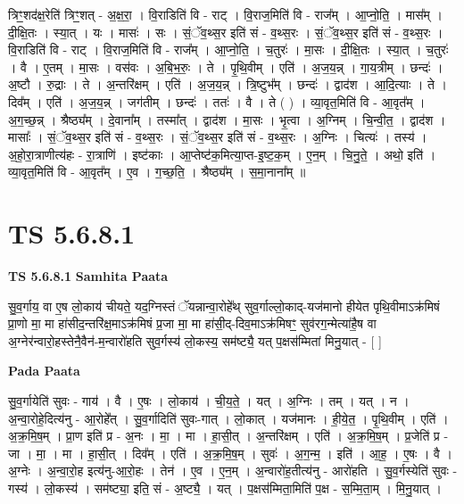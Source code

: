 \documentclass[17pt]{extarticle}
\begin{document}
त्रिꣳ॒॒शद॑क्ष॒रेति॑ त्रिꣳ॒॒शत् - अ॒क्ष॒रा॒ । वि॒राडिति॑ वि - राट् । वि॒राज॒मिति॑ वि - राज᳚म् । आ॒प्नो॒ति॒ । मास᳚म् । दी॒क्षि॒तः । स्या॒त् । यः । मासः॑ । सः । सं॒ॅव॒थ्स॒र इति॑ सं - व॒थ्स॒रः । सं॒ॅव॒थ्स॒र इति॑ सं - व॒थ्स॒रः । वि॒राडिति॑ वि - राट् । वि॒राज॒मिति॑ वि - राज᳚म् । आ॒प्नो॒ति॒ । च॒तुरः॑ । मा॒सः । दी॒क्षि॒तः । स्या॒त् । च॒तुरः॑ । वै । ए॒तम् । मा॒सः । वस॑वः । अ॒बि॒भ॒रुः॒ । ते । पृ॒थि॒वीम् । एति॑ । अ॒ज॒य॒न्न् । गा॒य॒त्रीम् । छन्दः॑ । अ॒ष्टौ । रु॒द्राः । ते । अ॒न्तरि॑क्षम् । एति॑ । अ॒ज॒य॒न्न् । त्रि॒ष्टुभ᳚म् । छन्दः॑ । द्वाद॑श । आ॒दि॒त्याः । ते । दिव᳚म् । एति॑ । अ॒ज॒य॒न्न् । जग॑तीम् । छन्दः॑ । ततः॑ । वै । ते ( ) । व्या॒वृत॒मिति॑ वि - आ॒वृत᳚म् । अ॒ग॒च्छ॒न्न् । श्रैष्ठ्य᳚म् । दे॒वाना᳚म् । तस्मा᳚त् । द्वाद॑श । मा॒सः । भृ॒त्वा । अ॒ग्निम् । चि॒न्वी॒त॒ । द्वाद॑श । मासाः᳚ । सं॒ॅव॒थ्स॒र इति॑ सं - व॒थ्स॒रः । सं॒ॅव॒थ्स॒र इति॑ सं - व॒थ्स॒रः । अ॒ग्निः । चित्यः॑ । तस्य॑ । अ॒हो॒रा॒त्राणीत्य॑हः - रा॒त्राणि॑ । इष्ट॑काः । आ॒प्तेष्ट॑क॒मित्या॒प्त-इ॒ष्ट॒क॒म् । ए॒न॒म् । चि॒नु॒ते॒ । अथो॒ इति॑ । व्या॒वृत॒मिति॑ वि - आ॒वृत᳚म् । ए॒व । ग॒च्छ॒ति॒ । श्रैष्ठ्य᳚म् । स॒मा॒नाना᳚म् ॥  \newline




\section*{ TS 5.6.8.1 }

\textbf{TS 5.6.8.1 } \newline
\textbf{Samhita Paata} \newline

सु॒व॒र्गाय॒ वा ए॒ष लो॒काय॑ चीयते॒ यद॒ग्निस्तं ॅयन्नान्वा॒रोहे᳚थ् सुव॒र्गाल्लो॒काद्-यज॑मानो हीयेत पृथि॒वीमाऽक्र॑मिषं प्रा॒णो मा॒ मा हा॑सीद॒न्तरि॑क्ष॒माऽक्र॑मिषं प्र॒जा मा॒ मा हा॑सी॒द्-दिव॒माऽक्र॑मिषꣳ॒॒ सुव॑रग॒न्मेत्या॑है॒ष वा अ॒ग्नेर॑न्वारो॒हस्तेनै॒वैन॑-म॒न्वारो॑हति सुव॒र्गस्य॑ लो॒कस्य॒ सम॑ष्ट्यै॒ यत् प॒क्षस॑म्मितां मिनु॒यात् - [  ] \newline

\textbf{Pada Paata} \newline

सु॒व॒र्गायेति॑ सुवः - गाय॑ । वै । ए॒षः । लो॒काय॑ । ची॒य॒ते॒ । यत् । अ॒ग्निः । तम् । यत् । न । अ॒न्वा॒रोहे॒दित्य॑नु - आ॒रोहे᳚त् । सु॒व॒र्गादिति॑ सुवः-गात् । लो॒कात् । यज॑मानः । ही॒ये॒त॒ । पृ॒थि॒वीम् । एति॑ । अ॒क्र॒मि॒ष॒म् । प्रा॒ण इति॑ प्र - अ॒नः । मा॒ । मा । हा॒सी॒त् । अ॒न्तरि॑क्षम् । एति॑ । अ॒क्र॒मि॒ष॒म् । प्र॒जेति॑ प्र - जा । मा॒ । मा । हा॒सी॒त् । दिव᳚म् । एति॑ । अ॒क्र॒मि॒ष॒म् । सुवः॑ । अ॒ग॒न्म॒ । इति॑ । आ॒ह॒ । ए॒षः । वै । अ॒ग्नेः । अ॒न्वा॒रो॒ह इत्य॑नु-आ॒रो॒हः । तेन॑ । ए॒व । ए॒न॒म् । अ॒न्वारो॑ह॒तीत्य॑नु - आरो॑हति । सु॒व॒र्गस्येति॑ सुवः - गस्य॑ । लो॒कस्य॑ । सम॑ष्ट्या॒ इति॒ सं - अ॒ष्ट्यै॒ । यत् । प॒क्षस॑म्मिता॒मिति॑ प॒क्ष - स॒म्मि॒ता॒म् । मि॒नु॒यात् ।  \newline
\end{document}
